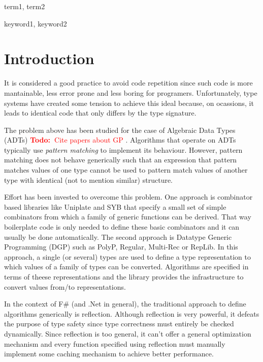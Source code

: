 \documentclass{sigplanconf}
\newcommand{\todo}[1]{
\ifthenelse
  {\boolean{showNotes}}
  {\textcolor{red}{\textbf{Todo:~}#1}}
  {}}
\begin{document}

\terms
term1, term2

\keywords
keyword1, keyword2

\section{Introduction}
It is considered a good practice to avoid code repetition since such
code is more mantainable, less error prone and less boring for 
programers. Unfortunately, type systems have created some tension
to achieve this ideal because, on ocassions, it leads to identical
code that only differs by the type signature.

The problem above has been studied for the case of Algebraic
Data Types (ADTs) \cite{} \todo{Cite papers about GP}. Algorithms
that operate on ADTs typically use \emph{pattern matching} to
implement its behaviour. However, pattern matching does not
behave generically such that an expression that pattern matches
values of one type cannot be used to pattern match values of
another type with identical (not to mention similar) structure.

Effort has been invested to overcome this problem. One approach is
combinator based libraries like Uniplate \cite{uniplate} and SYB\cite{syb}
that specify a small set of simple combinators from which a
family of generic functions can be derived. That way boilerplate
code is only needed to define these basic combinators and
it can usually be done automatically. The second approach
is Datatype Generic Programming (DGP) such as PolyP\cite{polyp}, 
Regular\cite{regular}, Multi-Rec\cite{multirec} or RepLib\cite{replib}. 
In this approach, a single (or several) types are used to define
a type representation to which values of a family of types can
be converted. Algorithms are specified in terms of theese
representations and the library provides the infrastructure
to convert values from/to representations.

In the context of F\# (and .Net in general), the traditional
approach to define algorithms generically is reflection. Although
reflection is very powerful, it defeats the purpose of type
safety since type correctness must entirely be checked dynamically.
Since reflection is too general, it can't offer a general optimization
mechanism and every function specified using reflection must
manually implement some caching mechanism to achieve better performance.
\end{document}
